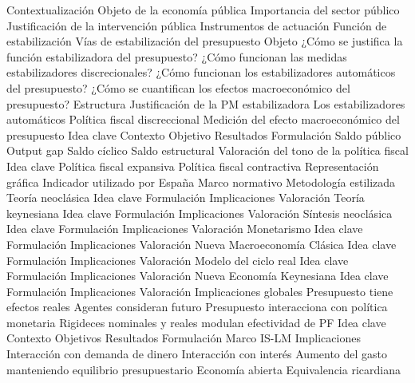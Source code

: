 \documentclass{nuevotema}
\begin{document}
\begin{esquema}[enumerate]
	\1[] 
		\2 Contextualización
			\3 Objeto de la economía pública
			\3 Importancia del sector público
			\3 Justificación de la intervención pública
			\3 Instrumentos de actuación
			\3 Función de estabilización
			\3 Vías de estabilización del presupuesto
		\2 Objeto
			\3 ¿Cómo se justifica la función estabilizadora del presupuesto?
			\3 ¿Cómo funcionan las medidas estabilizadores discrecionales?
			\3 ¿Cómo funcionan los estabilizadores automáticos del presupuesto?
			\3 ¿Cómo se cuantifican los efectos macroeconómico del presupuesto?
		\2 Estructura
			\3 Justificación de la PM estabilizadora
			\3 Los estabilizadores automáticos
			\3 Política fiscal discreccional
			\3 Medición del efecto macroeconómico del presupuesto
	\1 
		\2 Idea clave
			\3 Contexto
			\3 Objetivo
			\3 Resultados
		\2 Formulación
			\3 Saldo público
			\3 Output gap
			\3 Saldo cíclico
			\3 Saldo estructural
		\2 Valoración del tono de la política fiscal
			\3 Idea clave
			\3 Política fiscal expansiva
			\3 Política fiscal contractiva
			\3 Representación gráfica
		\2 Indicador utilizado por España
			\3 Marco normativo
			\3 Metodología estilizada
	\1 
		\2 Teoría neoclásica
			\3 Idea clave
			\3 Formulación
			\3 Implicaciones
			\3 Valoración
		\2 Teoría keynesiana
			\3 Idea clave
			\3 Formulación
			\3 Implicaciones
			\3 Valoración
		\2 Síntesis neoclásica
			\3 Idea clave
			\3 Formulación
			\3 Implicaciones
			\3 Valoración
		\2 Monetarismo
			\3 Idea clave
			\3 Formulación
			\3 Implicaciones
			\3 Valoración
		\2 Nueva Macroeconomía Clásica
			\3 Idea clave
			\3 Formulación
			\3 Implicaciones
			\3 Valoración
		\2 Modelo del ciclo real
			\3 Idea clave
			\3 Formulación
			\3 Implicaciones
			\3 Valoración
		\2 Nueva Economía Keynesiana
			\3 Idea clave
			\3 Formulación
			\3 Implicaciones
			\3 Valoración
		\2 Implicaciones globales
			\3 Presupuesto tiene efectos reales
			\3 Agentes consideran futuro
			\3 Presupuesto interacciona con política monetaria
			\3 Rigideces nominales y reales modulan efectividad de PF
	\1 
		\2 Idea clave
			\3 Contexto
			\3 Objetivos
			\3 Resultados
		\2 Formulación
			\3 Marco IS-LM
		\2 Implicaciones
			\3 Interacción con demanda de dinero
			\3 Interacción con interés
			\3 Aumento del gasto manteniendo equilibrio presupuestario
			\3 Economía abierta
			\3 Equivalencia ricardiana

\end{esquema}
\end{document}

